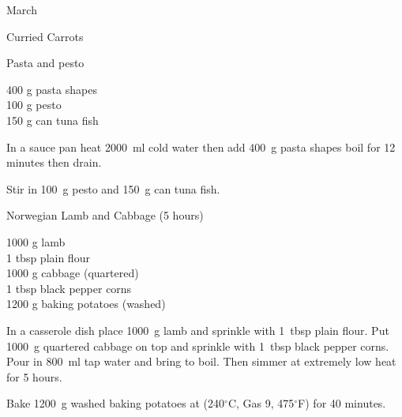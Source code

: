\begin{menu}{March}
\begin{recipe}{2}{Curried Carrots}
\begin{instructions}
    \end{instructions}
    \end{recipe}%
  
    \begin{recipe}{1}{Pasta and pesto}%
		\begin{ingredients}
		400 g pasta shapes  \\
	100 g pesto  \\
	150 g can tuna fish  \\
	
		\end{ingredients}
	
    \begin{instructions}
    \item 
      In a sauce pan heat
      2000~ml  cold water then add
      400~g  pasta shapes
      boil for 12
      minutes then drain.
    \item 
        Stir in
        100~g  pesto and
        150~g  can tuna fish.
      
    \end{instructions}
    \end{recipe}%
  
    \begin{recipe}{2}{Norwegian Lamb and Cabbage (5 hours)}%
		\begin{ingredients}
		1000 g lamb  \\
	1 tbsp plain flour  \\
	1000 g cabbage (quartered) \\
	1 tbsp black pepper corns  \\
	1200 g baking potatoes (washed) \\
	
		\end{ingredients}
	
    \begin{instructions}
    \item 
        In a casserole dish place
        1000~g  lamb
        and sprinkle with
        1~tbsp  plain flour.
        Put 
        1000~g quartered cabbage
        on top
        and sprinkle with
        1~tbsp  black pepper corns.
        Pour in 
        800~ml  tap water
        and bring to boil.
        Then simmer at extremely low heat for 5 hours.        
      \item 
      Bake 1200~g washed baking potatoes
      at
      (240$^{\circ}$C, Gas 9, 475$^{\circ}$F) for 40 minutes.
    
    \end{instructions}
    \end{recipe}%
  

\end{menu}

